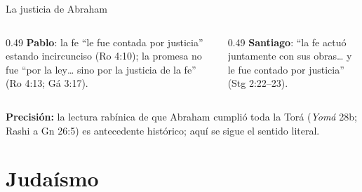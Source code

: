 \documentclass[hyperref={bookmarks=false},aspectratio=169]{beamer}
\newcommand{\precision}[1]{{\footnotesize\color{gris}\textbf{Precisión:} #1}}
\begin{document}
\begin{frame}{La justicia de Abraham}
\centering
{}\par\medskip
\begin{columns}[t,onlytextwidth]
\begin{column}{0.49\textwidth}\small
\textbf{\color{azul}Pablo}: la fe ``le fue contada por justicia'' estando incircunciso (Ro 4:10); la promesa no fue ``por la ley\ldots{} sino por la justicia de la fe'' (Ro 4:13; Gá 3:17).
\end{column}
\begin{column}{0.49\textwidth}\small
\textbf{\color{azul}Santiago}: ``la fe actuó juntamente con sus obras\ldots{} y le fue contado por justicia'' (Stg 2:22--23).
\end{column}
\end{columns}\par\smallskip
\precision{la lectura rabínica de que Abraham cumplió toda la Torá (\emph{Yomá} 28b; Rashi a Gn 26:5) es antecedente histórico; aquí se sigue el sentido literal.}
\end{frame}

\section{Judaísmo}
\end{document}
